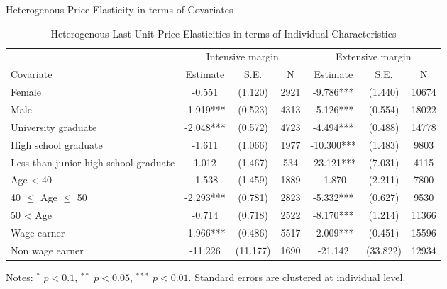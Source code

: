 \documentclass[
  ignorenonframetext,
  aspectratio=169,
]{beamer}
\begin{document}
\begin{frame}{Heterogenous Price Elasticity in terms of Covariates}
\protect\hypertarget{heterogenous-price-elasticity-in-terms-of-covariates}{}
\begin{table}

\caption{\label{tab:CovHeteroElasticity}Heterogenous Last-Unit Price Elasticities in terms of Individual Characteristics}
\centering
\fontsize{8}{10}\selectfont
\begin{threeparttable}
\begin{tabular}[t]{lcccccc}
\toprule
\multicolumn{1}{c}{ } & \multicolumn{3}{c}{Intensive margin} & \multicolumn{3}{c}{Extensive margin} \\
\cmidrule(l{3pt}r{3pt}){2-4} \cmidrule(l{3pt}r{3pt}){5-7}
Covariate & Estimate & S.E. & N & Estimate & S.E. & N\\
\midrule
Female & -0.551 & (1.120) & 2921 & -9.786*** & (1.440) & 10674\\
Male & -1.919*** & (0.523) & 4313 & -5.126*** & (0.554) & 18022\\
University graduate & -2.048*** & (0.572) & 4723 & -4.494*** & (0.488) & 14778\\
High school graduate & -1.611 & (1.066) & 1977 & -10.300*** & (1.483) & 9803\\
Less than junior high school graduate & 1.012 & (1.467) & 534 & -23.121*** & (7.031) & 4115\\
Age < 40 & -1.538 & (1.459) & 1889 & -1.870 & (2.211) & 7800\\
40 $\le$ Age $\le$ 50 & -2.293*** & (0.781) & 2823 & -5.332*** & (0.627) & 9530\\
50 < Age & -0.714 & (0.718) & 2522 & -8.170*** & (1.214) & 11366\\
Wage earner & -1.966*** & (0.486) & 5517 & -2.009*** & (0.451) & 15596\\
Non wage earner & -11.226 & (11.177) & 1690 & -21.142 & (33.822) & 12934\\
\bottomrule
\end{tabular}
\begin{tablenotes}
\item Notes: $^{*}$ $p < 0.1$, $^{**}$ $p < 0.05$, $^{***}$ $p < 0.01$. Standard errors are clustered at individual level.
\end{tablenotes}
\end{threeparttable}
\end{table}
\end{frame}
\end{document}
